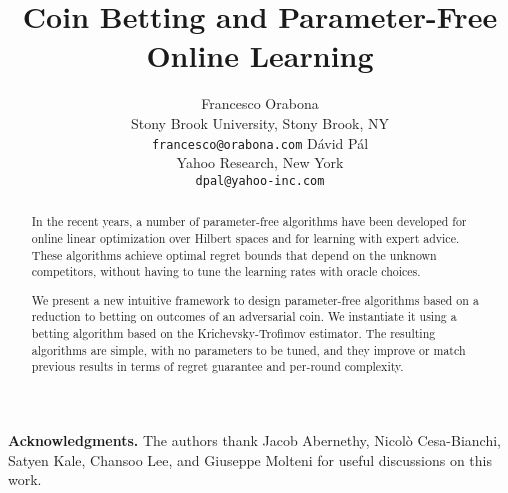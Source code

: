 \documentclass{article}
\author{
  Francesco Orabona\\
  Stony Brook University, Stony Brook, NY \\
  \texttt{francesco@orabona.com}
  \And
  D\'avid P\'al\\
  Yahoo Research, New York\\
  \texttt{dpal@yahoo-inc.com}
}
\title{Coin Betting and Parameter-Free Online Learning}
\begin{document}
\maketitle

\begin{abstract}
In the recent years, a number of parameter-free algorithms have been developed
for online linear optimization over Hilbert spaces and for learning with expert
advice.  These algorithms achieve optimal regret bounds that depend on the
unknown competitors, without having to tune the learning rates with oracle
choices.

We present a new intuitive framework to design parameter-free algorithms based
on a reduction to betting on outcomes of an adversarial coin. We instantiate it
using a betting algorithm based on the Krichevsky-Trofimov estimator.  The
resulting algorithms are simple, with no parameters to be tuned, and they
improve or match previous results in terms of regret guarantee and per-round
complexity.
\end{abstract}

\vspace{-0.2cm}











\textbf{Acknowledgments.} The authors thank Jacob Abernethy, Nicol\`{o}
Cesa-Bianchi, Satyen Kale, Chansoo Lee, and  Giuseppe Molteni for useful
discussions on this work.

\vspace{-0.38cm}

\begin{small}
\setlength{\bibsep}{2pt}


\end{small}

\appendix






\end{document}
